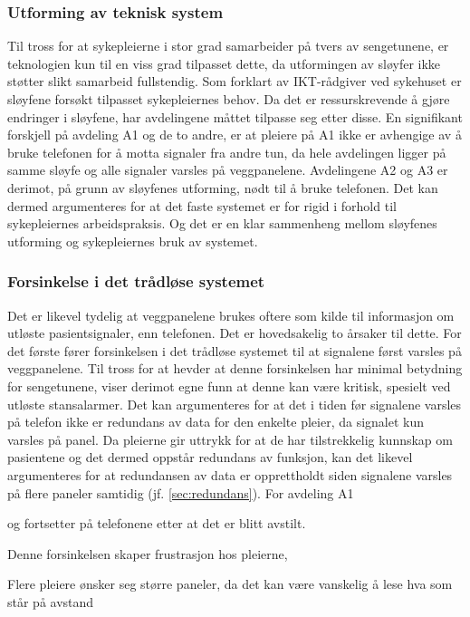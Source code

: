 \subsubsection{Utforming av teknisk system}
Til tross for at sykepleierne i stor grad samarbeider på tvers av sengetunene, er teknologien kun til en viss grad tilpasset dette, da utformingen av sløyfer ikke støtter slikt samarbeid fullstendig. Som forklart av IKT-rådgiver ved sykehuset er sløyfene forsøkt tilpasset sykepleiernes behov. Da det er ressurskrevende å gjøre endringer i sløyfene, har avdelingene måttet tilpasse seg etter disse. En signifikant forskjell på avdeling A1 og de to andre, er at pleiere på A1 ikke er avhengige av å bruke telefonen for å motta signaler fra andre tun, da hele avdelingen ligger på samme sløyfe og alle signaler varsles på veggpanelene. Avdelingene A2 og A3 er derimot, på grunn av sløyfenes utforming, nødt til å bruke telefonen. Det kan dermed argumenteres for at det faste systemet er for rigid i forhold til sykepleiernes arbeidspraksis. Og det er en klar sammenheng mellom sløyfenes utforming og sykepleiernes bruk av systemet.

\subsubsection{Forsinkelse i det trådløse systemet}
Det er likevel tydelig at veggpanelene brukes oftere som kilde til informasjon om utløste pasientsignaler, enn telefonen. Det er hovedsakelig to årsaker til dette. For det første fører forsinkelsen i det trådløse systemet til at signalene først varsles på veggpanelene. Til tross for at \citep{Sletten09} hevder at denne forsinkelsen har minimal betydning for sengetunene, viser derimot egne funn at denne kan være kritisk, spesielt ved utløste stansalarmer. Det kan argumenteres for at det i tiden før signalene varsles på telefon ikke er redundans av data for den enkelte pleier, da signalet kun varsles på panel. Da pleierne gir uttrykk for at de har tilstrekkelig kunnskap om pasientene og det dermed oppstår redundans av funksjon, kan det likevel argumenteres for at redundansen av data er opprettholdt siden signalene varsles på flere paneler samtidig (jf. \ref{sec:redundans}). For avdeling A1 


 og fortsetter på telefonene etter at det er blitt avstilt. 

 Denne forsinkelsen skaper frustrasjon hos pleierne,
 
 Flere pleiere ønsker seg større paneler, da det kan være vanskelig å lese hva som står på avstand

